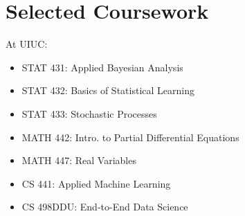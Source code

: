 \documentclass[11pt,a4paper,sans]{moderncv}
\begin{document}
\section{Selected Coursework}
At UIUC:
\begin{itemize}
    \setlength\itemindent{2.5cm}
    \item STAT 431: Applied Bayesian Analysis
    \item STAT 432: Basics of Statistical Learning
    \item STAT 433: Stochastic Processes
    \item MATH 442: Intro. to Partial Differential Equations
    \item MATH 447: Real Variables
    \item CS 441: Applied Machine Learning
    \item CS 498DDU: End-to-End Data Science
\end{itemize}
\end{document}
